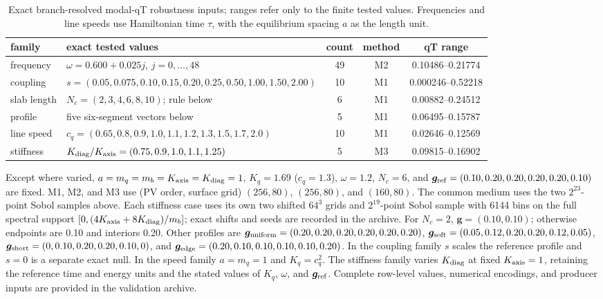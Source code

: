 \documentclass[10pt,aps,onecolumn,notitlepage,nofootinbib]{revtex4-2}
\begin{document}
\begin{table}[!htbp]
\caption{Exact branch-resolved modal-qT robustness inputs; ranges refer only to the finite tested values. Frequencies and line speeds use Hamiltonian time $\tau$, with the equilibrium spacing $a$ as the length unit.}
\label{tab:sm-modal-robust}
\centering\scriptsize\setlength{\tabcolsep}{2.8pt}\renewcommand{\arraystretch}{0.96}
\begin{tabular}{@{}llccc@{}}\toprule
family&exact tested values&count&method&qT range\\\midrule
frequency&$\omega=0.600+0.025j$, $j=0,\ldots,48$&49&M2&0.10486--0.21774\\
coupling&$s=(0.05,0.075,0.10,0.15,0.20,0.25,0.50,1.00,1.50,2.00)$&10&M1&0.000246--0.52218\\
slab length&$N_c=(2,3,4,6,8,10)$; rule below&6&M1&0.00882--0.24512\\
profile&five six-segment vectors below&5&M1&0.06495--0.15787\\
line speed&$c_q=(0.65,0.8,0.9,1.0,1.1,1.2,1.3,1.5,1.7,2.0)$&10&M1&0.02646--0.12569\\
stiffness&$K_{\rm diag}/K_{\rm axis}=(0.75,0.9,1.0,1.1,1.25)$&5&M3&0.09815--0.16902\\\bottomrule
\end{tabular}

\parbox{0.99\linewidth}{\scriptsize Except where varied, $a=m_q=m_b=K_{\rm axis}=K_{\rm diag}=1$, $K_q=1.69$ ($c_q=1.3$), $\omega=1.2$, $N_c=6$, and $\bm g_{\rm ref}=(0.10,0.20,0.20,0.20,0.20,0.10)$ are fixed. M1, M2, and M3 use (PV order, surface grid) $(256,80)$, $(256,80)$, and $(160,80)$. The common medium uses the two $2^{23}$-point Sobol samples above. Each stiffness case uses its own two shifted $64^3$ grids and $2^{19}$-point Sobol sample with 6144 bins on the full spectral support $[0,(4K_{\rm axis}+8K_{\rm diag})/m_b]$; exact shifts and seeds are recorded in the archive. For $N_c=2$, $\bm g=(0.10,0.10)$; otherwise endpoints are 0.10 and interiors 0.20. Other profiles are $\bm g_{\rm uniform}=(0.20,0.20,0.20,0.20,0.20,0.20)$, $\bm g_{\rm soft}=(0.05,0.12,0.20,0.20,0.12,0.05)$, $\bm g_{\rm short}=(0,0.10,0.20,0.20,0.10,0)$, and $\bm g_{\rm edge}=(0.20,0.10,0.10,0.10,0.10,0.20)$. In the coupling family $s$ scales the reference profile and $s=0$ is a separate exact null. In the speed family $a=m_q=1$ and $K_q=c_q^2$. The stiffness family varies $K_{\rm diag}$ at fixed $K_{\rm axis}=1$, retaining the reference time and energy units and the stated values of $K_q$, $\omega$, and $\bm g_{\rm ref}$. Complete row-level values, numerical encodings, and producer inputs are provided in the validation archive.}
\end{table}
\end{document}
